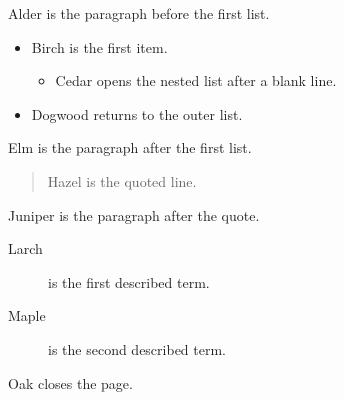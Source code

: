 \documentclass{article}
\begin{document}
Alder is the paragraph before the first list.

\begin{itemize}
\item Birch is the first item.

  \begin{itemize}
  \item Cedar opens the nested list after a blank line.
  \end{itemize}

\item Dogwood returns to the outer list.
\end{itemize}

Elm is the paragraph after the first list.

\begin{quote}
Hazel is the quoted line.
\end{quote}

Juniper is the paragraph after the quote.

\begin{description}
\item[Larch] is the first described term.
\item[Maple] is the second described term.
\end{description}

Oak closes the page.
\end{document}
